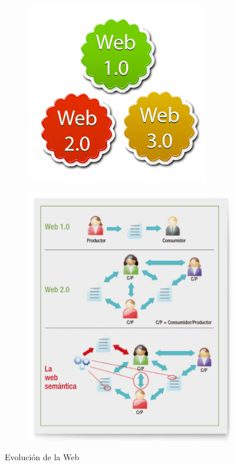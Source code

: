 \begin{figure}[H]
	\centering
	\begin{subfigure}[h]{0.22\textwidth} 
		\includegraphics[width=\textwidth]{imagenes/capitulo3/what_s-the-difference-between-web-1-0-web-2-0-web-3-0}
		\caption{}
	\end{subfigure}       
	\begin{subfigure}[h]{0.49\textwidth} 
		\includegraphics[width=\textwidth]{imagenes/capitulo3/10}
		\caption{}
	\end{subfigure}
	\caption{Evolución de la Web \cite{web-tipos, cwb}}
	\label{evolucion:web}
\end{figure}


